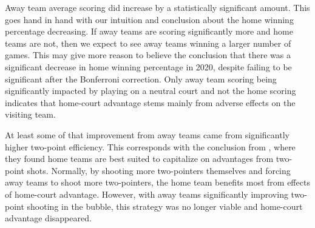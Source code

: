 \documentclass[10pt]{article}
\begin{document}
Away team average scoring did increase by a statistically significant amount.
This goes hand in hand with our intuition and conclusion about the home winning 
percentage decreasing. If away teams are scoring significantly more and home 
teams are not, then we expect to see away teams winning a larger number of games. 
This may give more reason to believe the conclusion that there was a significant 
decrease in home winning percentage in 2020, despite failing to be significant after 
the Bonferroni correction. Only away team scoring being significantly impacted by 
playing on a neutral court and not the home scoring indicates that home-court 
advantage stems mainly from adverse effects on the visiting team.

At least some of that improvement from away teams came from significantly higher
two-point efficiency. This corresponds with the conclusion from \citet{Harris},
where they found home teams are best suited to capitalize on advantages from two-point
shots. Normally, by shooting more two-pointers themselves and forcing away teams to
shoot more two-pointers, the home team benefits most from effects of
home-court advantage. However, with away teams significantly improving two-point
shooting in the bubble, this strategy was no longer viable and home-court
advantage disappeared.
\end{document}
